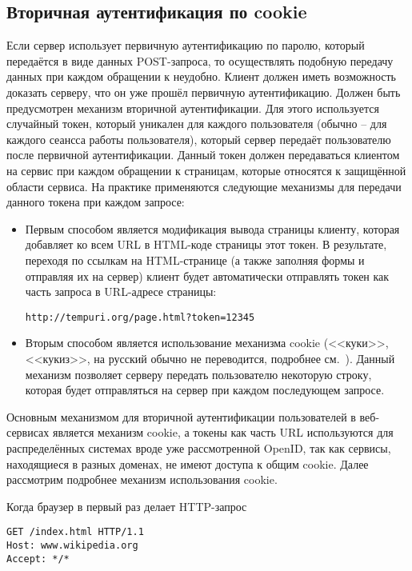 \subsection{Вторичная аутентификация по cookie}

Если сервер использует первичную аутентификацию по паролю, который передаётся в виде данных POST-запроса, то осуществлять подобную передачу данных при каждом обращении к неудобно. Клиент должен иметь возможность доказать серверу, что он уже прошёл первичную аутентификацию. Должен быть предусмотрен механизм вторичной аутентификации. Для этого используется случайный токен, который уникален для каждого пользователя (обычно -- для каждого сеансса работы пользователя), который сервер передаёт пользователю после первичной аутентификации. Данный токен должен передаваться клиентом на сервис при каждом обращении к страницам, которые относятся к защищённой области сервиса. На практике применяются следующие механизмы для передачи данного токена при каждом запросе:

\begin{itemize}
	\item Первым способом является модификация вывода страницы клиенту, которая добавляет ко всем URL в HTML-коде страницы этот токен. В результате, переходя по ссылкам на HTML-странице (а также заполняя формы и отправляя их на сервер) клиент будет автоматически отправлять токен как часть запроса в URL-адресе страницы:

\texttt{http://tempuri.org/page.html?token=12345}
	\item Вторым способом является использование механизма cookie (<<куки>>, <<кукиз>>, на русский обычно не переводится, подробнее см.~\cite[Client Identification and Cookies]{Totty:2002}). Данный механизм позволяет серверу передать пользователю некоторую строку, которая будет отправляться на сервер при каждом последующем запросе.
\end{itemize}

Основным механизмом для вторичной аутентификации пользователей в веб-сервисах является механизм cookie, а токены как часть URL используются для распределённых системах вроде уже рассмотренной OpenID, так как сервисы, находящиеся в разных доменах, не имеют доступа к общим cookie. Далее рассмотрим подробнее механизм использования cookie.

Когда браузер в первый раз делает HTTP-запрос
\begin{center} \begin{verbatim}
GET /index.html HTTP/1.1
Host: www.wikipedia.org
Accept: */*
\end{verbatim} \end{center}

